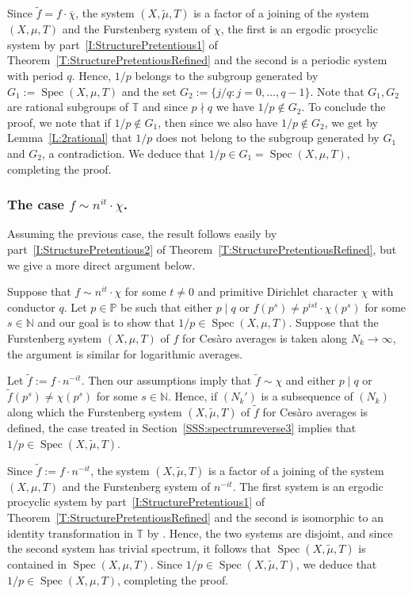 \documentclass[11pt]{amsart}
\theoremstyle{definition}
\newcommand{\N}{{\mathbb N}}
\renewcommand{\P}{{\mathbb P}}
\newcommand{\T}{{\mathbb T}}
\DeclareMathOperator{\spec}{Spec}
\begin{document}
Since $\tilde{f}=f\cdot \overline{\chi}$,  the system
$(X,\tilde{\mu},T)$ is a factor of a joining of the system $(X,\mu,T)$ and  the Furstenberg system of  $\chi$, the first is an ergodic procyclic system by part~\eqref{I:StructurePretentious1} of Theorem~\ref{T:StructurePretentiousRefined} and the second is a periodic system with period $q$. Hence, $1/p$ belongs to the subgroup generated  by $G_1:=\spec(X,\mu,T)$ and the set $G_2:=\{j/q\colon j=0,\ldots, q-1\}$. Note that 
$G_1,G_2$ are rational subgroups of $\T$ and since $p\nmid q$ we have $1/p\not\in G_2$. 
 To conclude the proof, we note that if $1/p\not\in G_1$, then  since we also have $1/p\not\in G_2$,  we get by Lemma~\ref{L:2rational}
 that $1/p$ does   not belong to   the subgroup generated by $G_1$ and $G_2$,  a contradiction. We deduce that  $1/p\in G_1=\spec(X,\mu,T)$, completing the proof.

\subsubsection{The case  $f\sim n^{it}\cdot  \chi$.}\label{SSS:spectrumreverse4}
Assuming the previous case, the result follows easily by part~\eqref{I:StructurePretentious2} of Theorem~\ref{T:StructurePretentiousRefined}, but we give a more direct argument below.

  Suppose that $f\sim n^{it}\cdot  \chi$ for some $t\neq 0$ and primitive Dirichlet character $\chi$ with conductor $q$.  Let $p\in \P$ be such that either $p\mid q$ or 
$f(p^s)\neq p^{ist}\cdot \chi(p^s)$ for some $s\in \N$ and our goal is to show that $1/p\in \spec(X,\mu,T)$. Suppose that the Furstenberg system  $(X,\mu,T)$  of $f$ for Ces\`aro averages is taken along $N_k\to\infty$, the argument is similar for logarithmic averages.

Let $\tilde{f}:=f\cdot n^{-it}$.   Then our assumptions imply that $\tilde{f}\sim \chi$
and  either $p\mid q$ or  $\tilde{f}(p^s)\neq \chi(p^s)$ for some $s\in \N$.
Hence, if $(N_k')$ is a subsequence of $(N_k)$ along which the Furstenberg system $(X,\tilde{\mu},T)$ of $\tilde{f}$ for Ces\`aro averages is defined,  the case treated in Section~\ref{SSS:spectrumreverse3} implies that $1/p\in \spec(X,\tilde{\mu},T)$.

Since  $\tilde{f}:=f\cdot n^{-it}$, the system
$(X,\tilde{\mu},T)$ is a factor of a joining of the system $(X,\mu,T)$ and  the Furstenberg system of  $n^{-it}$. The first system is  an   ergodic procyclic system by part~\eqref{I:StructurePretentious1} of Theorem~\ref{T:StructurePretentiousRefined} and the second is isomorphic to an identity transformation in $\T$ by \cite[Corollary~5.5]{GLR21} . Hence, the two systems are disjoint, and since the second system has trivial spectrum,  it follows that  $\spec(X,\tilde{\mu},T)$ is contained in $\spec(X,\mu,T)$. Since $1/p\in
\spec(X,\tilde{\mu},T)$, we deduce that $1/p\in  \spec(X,\mu,T)$, completing the proof.
\end{document}
